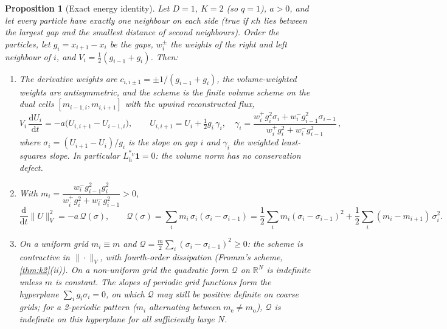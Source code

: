 \documentclass[11pt,a4paper]{article}
\theoremstyle{plain}
\newtheorem{proposition}[theorem]{Proposition}
\theoremstyle{definition}
\theoremstyle{remark}
\numberwithin{equation}{section}
\newcommand{\R}{\mathbb{R}}
\newcommand{\dd}{\mathrm{d}}
\begin{document}
\begin{proposition}[Exact energy identity]\label{prop:nn}
Let $D=1$, $K=2$ (so $q=1$), $a>0$, and let every particle have exactly one neighbour on each side (true if $\kappa h$ lies between the largest gap and the smallest distance of second neighbours). Order the particles, let $g_i=x_{i+1}-x_i$ be the gaps, $w^{\pm}_i$ the weights of the right and left neighbour of $i$, and $V_i=\tfrac12(g_{i-1}+g_i)$. Then:
\begin{enumerate}[label=(\roman*)]
\item The derivative weights are $c_{i,i\pm1}=\pm1/(g_{i-1}+g_i)$, the volume-weighted weights are antisymmetric, and the scheme is the finite volume scheme on the dual cells $[m_{i-1,i},m_{i,i+1}]$ with the upwind reconstructed flux,
\begin{equation}\label{eq:fv}
V_i\,\frac{\dd U_i}{\dd t}=-a\big(U_{i,i+1}-U_{i-1,i}\big),\qquad U_{i,i+1}=U_i+\tfrac12g_i\,\gamma_i,\quad \gamma_i=\frac{w^+_ig_i^2\sigma_i+w^-_ig_{i-1}^2\sigma_{i-1}}{w^+_ig_i^2+w^-_ig_{i-1}^2}\,,
\end{equation}
where $\sigma_i=(U_{i+1}-U_i)/g_i$ is the slope on gap $i$ and $\gamma_i$ the weighted least-squares slope. In particular $L_h^{*_V}\mathbf 1=0$: the volume norm has no conservation defect.
\item With $m_i=\dfrac{w^-_ig_{i-1}^2g_i^2}{w^+_ig_i^2+w^-_ig_{i-1}^2}>0$,
\begin{equation}\label{eq:nnQ}
\frac{\dd}{\dd t}\|U\|_V^2=-a\,\mathcal Q(\sigma),\qquad \mathcal Q(\sigma)=\sum_im_i\,\sigma_i(\sigma_i-\sigma_{i-1})=\frac12\sum_im_i(\sigma_i-\sigma_{i-1})^2+\frac12\sum_i(m_i-m_{i+1})\,\sigma_i^2 .
\end{equation}
\item On a uniform grid $m_i\equiv m$ and $\mathcal Q=\tfrac m2\sum_i(\sigma_i-\sigma_{i-1})^2\ge0$: the scheme is contractive in $\|\cdot\|_V$, with fourth-order dissipation (Fromm's scheme, \cref{thm:k2}(ii)). On a non-uniform grid the quadratic form $\mathcal Q$ on $\R^N$ is indefinite unless $m$ is constant. The slopes of periodic grid functions form the hyperplane $\sum_ig_i\sigma_i=0$, on which $\mathcal Q$ may still be positive definite on coarse grids; for a 2-periodic pattern ($m_i$ alternating between $m_{\mathrm e}\ne m_{\mathrm o}$), $\mathcal Q$ is indefinite on this hyperplane for all sufficiently large $N$.
\end{enumerate}
\end{proposition}
\end{document}
